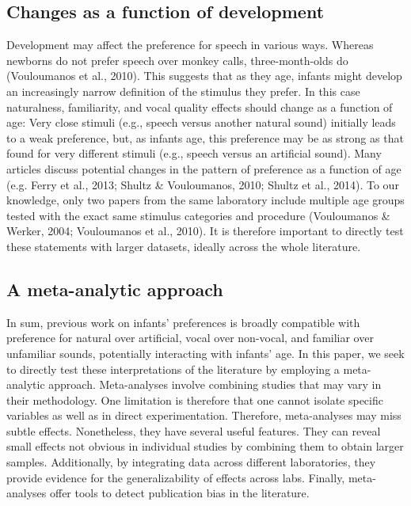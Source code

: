 \documentclass[man]{apa6}
\begin{document}
\subsection{Changes as a function of
development}\label{changes-as-a-function-of-development}

Development may affect the preference for speech in various ways.
Whereas newborns do not prefer speech over monkey calls,
three-month-olds do (Vouloumanos et al., 2010). This suggests that as
they age, infants might develop an increasingly narrow definition of the
stimulus they prefer. In this case naturalness, familiarity, and vocal
quality effects should change as a function of age: Very close stimuli
(e.g., speech versus another natural sound) initially leads to a weak
preference, but, as infants age, this preference may be as strong as
that found for very different stimuli (e.g., speech versus an artificial
sound). Many articles discuss potential changes in the pattern of
preference as a function of age (e.g. Ferry et al., 2013; Shultz \&
Vouloumanos, 2010; Shultz et al., 2014). To our knowledge, only two
papers from the same laboratory include multiple age groups tested with
the exact same stimulus categories and procedure (Vouloumanos \& Werker,
2004; Vouloumanos et al., 2010). It is therefore important to directly
test these statements with larger datasets, ideally across the whole
literature.

\subsection{A meta-analytic approach}\label{a-meta-analytic-approach}

In sum, previous work on infants' preferences is broadly compatible with
preference for natural over artificial, vocal over non-vocal, and
familiar over unfamiliar sounds, potentially interacting with infants'
age. In this paper, we seek to directly test these interpretations of
the literature by employing a meta-analytic approach. Meta-analyses
involve combining studies that may vary in their methodology. One
limitation is therefore that one cannot isolate specific variables as
well as in direct experimentation. Therefore, meta-analyses may miss
subtle effects. Nonetheless, they have several useful features. They can
reveal small effects not obvious in individual studies by combining them
to obtain larger samples. Additionally, by integrating data across
different laboratories, they provide evidence for the generalizability
of effects across labs. Finally, meta-analyses offer tools to detect
publication bias in the literature.
\end{document}

